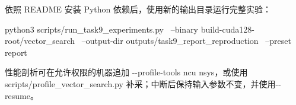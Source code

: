 \documentclass[UTF8,a4paper,zihao=5,fontset=none]{ctexart}
\begin{document}

依照 README 安装 Python 依赖后，使用新的输出目录运行完整实验：


\par{}
\begin{ReportCode}
python3 scripts/run_task9_experiments.py \
  --binary build-cuda128-root/vector_search \
  --output-dir outputs/task9_report_reproduction \
  --preset report
\end{ReportCode}

性能剖析可在允许权限的机器追加 {\small\ttfamily -\allowbreak{}-\allowbreak{}profil\allowbreak{}e-\allowbreak{}tools \allowbreak{}ncu nsys\allowbreak{}}，或使用{\small\ttfamily scripts/\allowbreak{}profile\_\allowbreak{}vector\_\allowbreak{}s\allowbreak{}earch.\allowbreak{}py\allowbreak{}} 补采；中断后保持输入参数不变，并使用{\small\ttfamily -\allowbreak{}-\allowbreak{}resume}。
\end{document}
